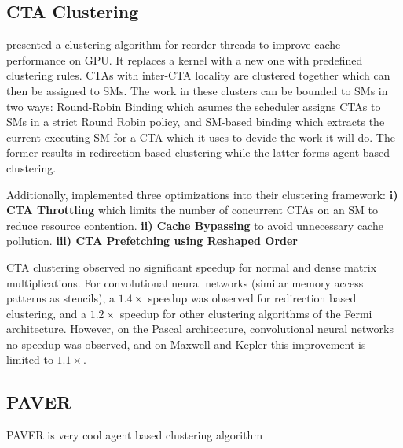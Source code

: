 \subsection{CTA Clustering}
\citeauthor{li2017locality} presented a clustering algorithm for reorder threads to improve cache performance on GPU.
It replaces a kernel with a new one with predefined clustering rules.
CTAs with inter-CTA locality are clustered together which can then be assigned to SMs.
The work in these clusters can be bounded to SMs in two ways:
Round-Robin Binding which asumes the scheduler assigns CTAs to SMs in a strict Round Robin policy, and SM-based binding which extracts the current executing SM for a CTA which it uses to devide the work it will do.
The former results in redirection based clustering while the latter forms agent based clustering.

Additionally, \citeauthor{li2017locality} implemented three optimizations into their clustering framework: 
\textbf{i) CTA Throttling} which limits the number of concurrent CTAs on an SM to reduce resource contention.
\textbf{ii) Cache Bypassing} to avoid unnecessary cache pollution.
\textbf{iii) CTA Prefetching using Reshaped Order}

CTA clustering observed no significant speedup for normal and dense matrix multiplications.
For convolutional neural networks (similar memory access patterns as stencils), a $1.4\times$ speedup was observed for redirection based clustering, and a $1.2\times$ speedup for other clustering algorithms of the Fermi architecture.
However, on the Pascal architecture, convolutional neural networks no speedup was observed, and on Maxwell and Kepler this improvement is limited to $1.1\times$.

\subsection{PAVER}
PAVER is very cool agent based clustering algorithm
